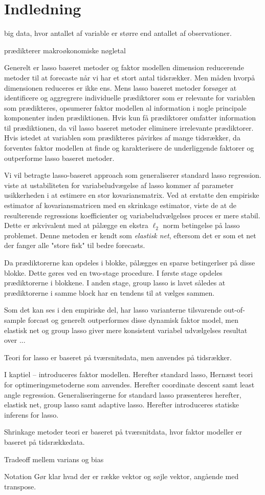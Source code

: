 \chapter{Indledning}

big data, hvor antallet af variable er større end antallet af observationer.

prædikterer makroøkonomiske nøgletal

Generelt er lasso baseret metoder og faktor modellen dimension reducerende metoder til at forecaste når vi har et stort antal tidsrækker.
Men måden hvorpå dimensionen reduceres er ikke ens.
Mens lasso baseret metoder forsøger at identificere og aggregrere individuelle prædiktorer som er relevante for variablen som prædikteres, opsumerer faktor modellen al information i nogle principale komponenter inden prædiktionen.
Hvis kun få prædiktorer omfatter information til prædiktionen, da vil lasso baseret metoder eliminere irrelevante prædiktorer.
Hvis istedet at variablen som prædikteres påvirkes af mange tidsrækker, da forventes faktor modellen at finde og karakterisere de underliggende faktorer og outperforme lasso baseret metoder.


Vi vil betragte lasso-baseret approach som generaliserer standard lasso regression.
\citep{zou_hastie} viste at ustabiliteten for variabeludvægelse af lasso kommer af parameter usikkerheden i at estimere en stor kovariansmatrix.
Ved at erstatte den empiriske estimator af kovariansmatricen med en skrinkage estimator, viste de at de resulterende regressions koefficienter og variabeludvælgelses proces er mere stabil.
Dette er ækvivalent med at pålægge en ekstra \(\ell_2\) norm betingelse på lasso problemet.
Denne metoden er kendt som \textit{elastisk net}, eftersom det er som et net der fanger alle "store fisk" til bedre forecasts.

Da prædiktorerne kan opdeles i blokke, pålægges en sparse betingerlser på disse blokke.
Dette gøres ved en two-stage procedure.
I første stage opdeles prædiktorerne i blokkene. I anden stage, group lasso \citep{group_lasso} is lavet således at prædiktorerne i samme block har en tendens til at vælges sammen.

Som det kan ses i den empiriske del, har lasso varianterne tilsvarende out-of-sample forcast og generelt outperformes disse dynamisk faktor model, men elastisk net og group lasso giver mere konsistent variabel udvælgelses resultat over ...


Teori for lasso er baseret på tværsnitsdata, men anvendes på tidsrækker.


I kaptiel -- introduceres faktor modellen.
Herefter standard lasso,
Hernæst teori for optimeringsmetoderne som anvendes.
Herefter coordinate descent samt least angle regression.
Generaliseringerne for standard lasso præsenteres herefter, elastisk net, group lasso samt adaptive lasso.
Herefter introduceres statiske inferens for lasso.

Shrinkage metoder teori er baseret på tværsnitdata, hvor faktor modeller er baseret på tidsrækkedata. 


Tradeoff mellem varians og bias

Notation
Gør klar hvad der er række vektor og søjle vektor, angående med transpose.  
